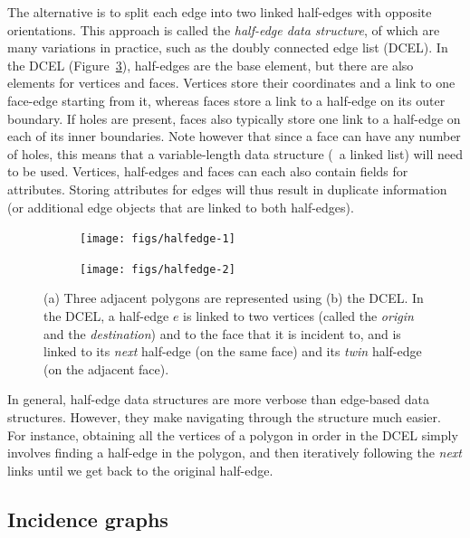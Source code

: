 The alternative is to split each edge into two linked half-edges with opposite orientations.
This approach is called the \emph{half-edge data structure}, of which are many variations in practice, such as the doubly connected edge list (DCEL).
In the DCEL (Figure~\ref{fig:halfedge}), half-edges are the base element, but there are also elements for vertices and faces.
Vertices store their coordinates and a link to one face-edge starting from it, whereas faces store a link to a half-edge on its outer boundary.
If holes are present, faces also typically store one link to a half-edge on each of its inner boundaries.
Note however that since a face can have any number of holes, this means that a variable-length data structure (\eg\ a linked list) will need to be used.
Vertices, half-edges and faces can each also contain fields for attributes.
Storing attributes for edges will thus result in duplicate information (or additional edge objects that are linked to both half-edges).

\begin{figure}
\centering
\begin{subfigure}[b]{0.27\linewidth}
\texttt{[image: figs/halfedge-1]}
\caption{}%
\label{subfig:halfedge-1}
\end{subfigure}
\quad
\begin{subfigure}[b]{0.27\linewidth}
\texttt{[image: figs/halfedge-2]}
\caption{}%
\label{subfig:halfedge-2}
\end{subfigure}
\caption[Three adjacent polygons are represented using the DCEL]{(a) Three adjacent polygons are represented using (b) the DCEL\@.
In the DCEL, a half-edge \(e\) is linked to two vertices (called the \emph{origin} and the \emph{destination}) and to the face that it is incident to, and is linked to its \emph{next} half-edge (on the same face) and its \emph{twin} half-edge (on the adjacent face).}%
\label{fig:halfedge}
\end{figure}

In general, half-edge data structures are more verbose than edge-based data structures.
However, they make navigating through the structure much easier.
For instance, obtaining all the vertices of a polygon in order in the DCEL simply involves finding a half-edge in the polygon, and then iteratively following the \emph{next} links until we get back to the original half-edge.

\subsection{Incidence graphs}

